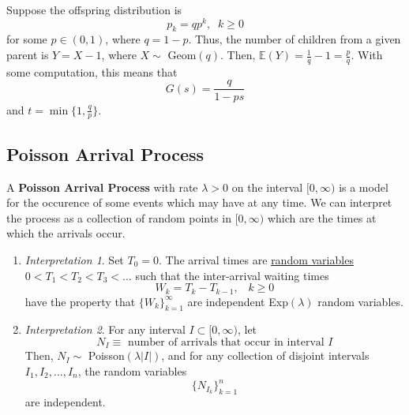     \begin{example}
      \label{ex:branching-process-with-geometric-offspring}
      Suppose the offspring distribution is
      \begin{equation}
        p_k = q p^k, \;\; k \geq 0
      \end{equation}
      for some $p \in (0, 1)$, where $q = 1-p$. Thus, the number of children from a given parent is $Y = X - 1$, where $X \sim$ Geom$(q)$. Then, $\mathbb{E}(Y) = \frac{1}{q} - 1 = \frac{p}{q}$. With some computation, this means that
      \begin{equation}
        G(s) = \frac{q}{1- p s}
      \end{equation}
      and $t = \min \{1, \frac{q}{p}\}$. 
    \end{example}

\subsection{Poisson Arrival Process}

  A \textbf{Poisson Arrival Process} with rate $\lambda > 0$ on the interval $[0, \infty)$ is a model for the occurence of some events which may have at any time. We can interpret the process as a collection of random points in $[0, \infty)$ which are the times at which the arrivals occur. 
  \begin{enumerate}
    \item \textit{Interpretation 1}. Set $T_0 = 0$. The arrival times are \hyperref[def:random-variable]{random variables} $0 < T_1 < T_2 < T_3 < ...$ such that the inter-arrival waiting times
    \begin{equation}
      W_k = T_k - T_{k-1}, \;\;\; k \geq 0
    \end{equation}
    have the property that $\{W_k\}_{k=1}^\infty$ are independent Exp$(\lambda)$ random variables. 

    \item \textit{Interpretation 2}. For any interval $I \subset [0, \infty)$, let 
    \begin{equation}
      N_I \equiv \text{ number of arrivals that occur in interval } I
    \end{equation}
    Then, $N_I \sim$ Poisson$(\lambda |I|)$, and for any collection of disjoint intervals $I_1, I_2, ..., I_n$, the random variables 
    \begin{equation}
      \{N_{I_k}\}_{k=1}^n
    \end{equation}
  are independent. 
  \end{enumerate}

